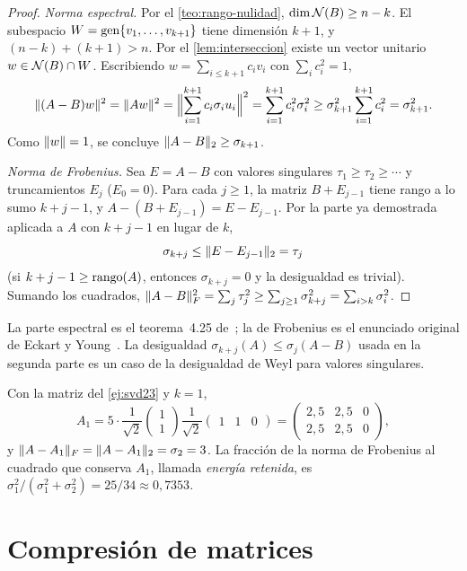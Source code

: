 \begin{proof}
\emph{Norma espectral.} Por el \cref{teo:rango-nulidad}, $\dim\mathcal{N}(B)\ge n-k$. El subespacio $W=\operatorname{gen}\{v_1,\dots,v_{k+1}\}$ tiene dimensión $k+1$, y $(n-k)+(k+1)>n$. Por el \cref{lem:interseccion} existe un vector unitario $w\in\mathcal{N}(B)\cap W$. Escribiendo $w=\sum_{i\le k+1}c_iv_i$ con $\sum_ic_i^{2}=1$,
\[
\lVert(A-B)w\rVert^{2}=\lVert Aw\rVert^{2}=\Bigl\|\sum_{i=1}^{k+1}c_i\sigma_iu_i\Bigr\|^{2}=\sum_{i=1}^{k+1}c_i^{2}\sigma_i^{2}\ge\sigma_{k+1}^{2}\sum_{i=1}^{k+1}c_i^{2}=\sigma_{k+1}^{2}.
\]
Como $\lVert w\rVert=1$, se concluye $\lVert A-B\rVert_2\ge\sigma_{k+1}$.

\emph{Norma de Frobenius.} Sea $E=A-B$ con valores singulares $\tau_1\ge\tau_2\ge\cdots$ y truncamientos $E_{j}$ ($E_0=0$). Para cada $j\ge 1$, la matriz $B+E_{j-1}$ tiene rango a lo sumo $k+j-1$, y $A-(B+E_{j-1})=E-E_{j-1}$. Por la parte ya demostrada aplicada a $A$ con $k+j-1$ en lugar de $k$,
\[
\sigma_{k+j}\le\lVert E-E_{j-1}\rVert_2=\tau_j
\]
(si $k+j-1\ge\operatorname{rango}(A)$, entonces $\sigma_{k+j}=0$ y la desigualdad es trivial).
Sumando los cuadrados, $\lVert A-B\rVert_F^{2}=\sum_j\tau_j^{2}\ge\sum_{j\ge 1}\sigma_{k+j}^{2}=\sum_{i>k}\sigma_i^{2}$.
\end{proof}

La parte espectral es el teorema~4.25 de~\cite{mml}; la de Frobenius es el enunciado original de Eckart y Young~\cite{eckart-young}. La desigualdad $\sigma_{k+j}(A)\le\sigma_j(A-B)$ usada en la segunda parte es un caso de la desigualdad de Weyl para valores singulares.

\begin{ejemplo}\label{ej:A1}
Con la matriz del \cref{ej:svd23} y $k=1$,
\[
A_1=5\cdot\frac{1}{\sqrt{2}}\begin{pmatrix}1\\1\end{pmatrix}\frac{1}{\sqrt{2}}\begin{pmatrix}1&1&0\end{pmatrix}=\begin{pmatrix}2{,}5&2{,}5&0\\2{,}5&2{,}5&0\end{pmatrix},
\]
y $\lVert A-A_1\rVert_F=\lVert A-A_1\rVert_2=\sigma_2=3$. La fracción de la norma de Frobenius al cuadrado que conserva $A_1$, llamada \emph{energía retenida}, es $\sigma_1^{2}/(\sigma_1^{2}+\sigma_2^{2})=25/34\approx 0{,}7353$.
\end{ejemplo}

\section{Compresión de matrices}

